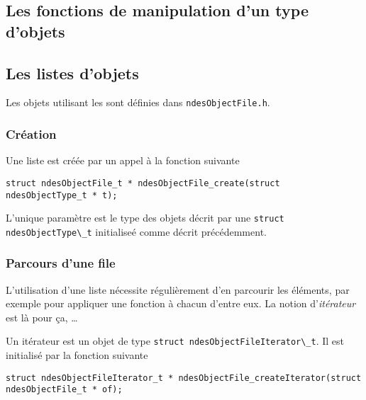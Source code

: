 \subsection{Les fonctions de manipulation d'un type d'objets}

%
\subsection{Les listes d'objets}

   Les objets utilisant  les sont définies dans {\tt ndesObjectFile.h}.

%
\subsubsection{Création}

   Une liste est créée par un appel à la fonction suivante

\begin{verbatim}
struct ndesObjectFile_t * ndesObjectFile_create(struct ndesObjectType_t * t);
\end{verbatim}

   L'unique paramètre est le type des objets décrit par une
\lstinline{struct ndesObjectType\_t} initialiseé comme décrit
précédemment.

%
\subsubsection{Parcours d'une file}

   L'utilisation d'une liste nécessite régulièrement d'en parcourir
les éléments, par exemple pour appliquer une fonction à chacun d'entre
eux. La notion d'{\em itérateur} est là pour ça, \ldots

   Un itérateur est un objet de type \lstinline{struct ndesObjectFileIterator\_t}.
 Il est initialisé par la fonction
suivante 

\begin{verbatim}
struct ndesObjectFileIterator_t * ndesObjectFile_createIterator(struct
ndesObjectFile_t * of);
\end{verbatim}

